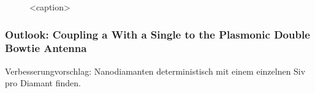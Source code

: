 
			\begin{figure}[tp]
				\begin{subfigure}[t]{ 0.49\linewidth}
					\centering
					\caption{}
					\label{subfig::single_siv_spec_after_transfer_antenna_bkg_corrected}
				\end{subfigure}
				\hfill
				\begin{subfigure}[t]{ 0.49\linewidth}
					\centering
					\caption{}
					\label{subfig::single_siv_spec_bkg_antenna}
				\end{subfigure}
				\caption{<caption>}
			\end{figure}

		\subsubsection{Outlook: Coupling a \Nd With a Single \Siv to the Plasmonic Double Bowtie Antenna}
			Verbesserungvorschlag: Nanodiamanten deterministisch mit einem einzelnen Siv pro Diamant finden.
